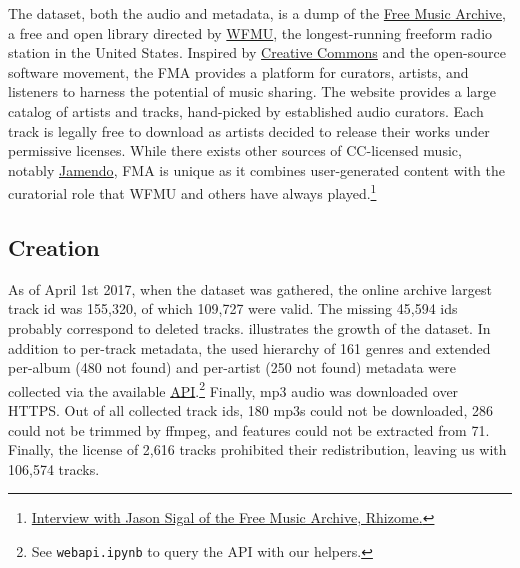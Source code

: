 \documentclass{article}
\newcommand{\ntracks}{106,574 }
\begin{document}
The dataset, both the audio and metadata, is a dump of the \href{https://freemusicarchive.org/}{Free Music Archive}, a free and open library directed by \href{https://wfmu.org/}{WFMU}, the longest-running freeform radio station in the United States.
Inspired by \href{https://creativecommons.org/}{Creative Commons} and the open-source software movement, the FMA provides a platform for curators, artists, and listeners to harness the potential of music sharing.
The website provides a large catalog of artists and tracks, hand-picked by established audio curators. Each track is legally free to download as artists decided to release their works under permissive licenses.
While there exists other sources of CC-licensed music, notably \href{https://www.jamendo.com}{Jamendo}, FMA is unique as it combines user-generated content with the curatorial role that WFMU and others have always played.\footnote{\href{http://rhizome.org/editorial/2009/may/1/interview-with-jason-sigal-of-the-free-music-archi}{Interview with Jason Sigal of the Free Music Archive, Rhizome.}}

\subsection{Creation} %

As of April 1st 2017, when the dataset was gathered, the online archive largest track id was 155,320, of which 109,727 were valid. The missing 45,594 ids probably correspond to deleted tracks.  illustrates the growth of the dataset. In addition to per-track metadata, the used hierarchy of 161 genres and extended per-album (480 not found) and per-artist (250 not found) metadata were collected via the available \href{https://freemusicarchive.org/api}{API}.\footnote{See \texttt{webapi.ipynb} to query the API with our helpers.} Finally, mp3 audio was downloaded over HTTPS.
Out of all collected track ids, 180 mp3s could not be downloaded, 286 could not be trimmed by ffmpeg, and features could not be extracted from 71. Finally, the license of 2,616 tracks prohibited their redistribution, leaving us with \ntracks tracks.
\end{document}
